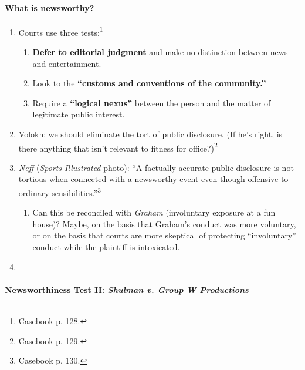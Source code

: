 \paragraph{What is newsworthy?}

\begin{enumerate}
    \item Courts use three tests:\footnote{Casebook p. 128.}
    \begin{enumerate}
        \item \textbf{Defer to editorial judgment} and make no distinction 
        between news and entertainment.
        \item Look to the \textbf{``customs and conventions of the community.''}
        \item Require a \textbf{``logical nexus''} between the person and the 
        matter of legitimate public interest.
    \end{enumerate}
    \item Volokh: we should eliminate the tort of public disclosure. (If he's 
    right, is there anything that isn't relevant to fitness for 
    office?)\footnote{Casebook p. 129.}
    \item \emph{Neff} (\emph{Sports Illustrated} photo): ``A factually accurate 
    public disclosure is not tortious when connected with a newsworthy event 
    even though offensive to ordinary sensibilities.''\footnote{Casebook p. 
    130.}
    \begin{enumerate}
        \item Can this be reconciled with \emph{Graham} (involuntary exposure at 
        a fun house)? Maybe, on the basis that Graham's conduct was more 
        voluntary, or on the basis that courts are more skeptical of protecting
        ``involuntary'' conduct while the plaintiff is intoxicated.
    \end{enumerate}
    \item %
\end{enumerate}

\paragraph{Newsworthiness Test II: \emph{Shulman v. Group W Productions}}


